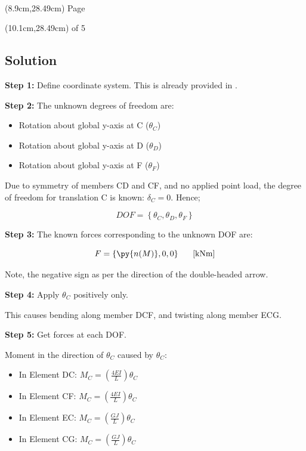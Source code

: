 \documentclass[a4paper,11pt]{article}
\begin{document}
\\
\begin{textblock*}{5cm}(8.9cm,28.49cm)
Page
\end{textblock*}
\begin{textblock*}{5cm}(10.1cm,28.49cm)
of 5
\end{textblock*}
\begin{hidden}	
\clearpage
\section{Solution}

\textbf{Step 1:} Define coordinate system. This is already provided in . 

\textbf{Step 2:} The unknown degrees of freedom are: 

\begin{itemize}
	\item Rotation about global y-axis at C ($\theta_C$)
	\item Rotation about global y-axis at D ($\theta_D$)
	\item Rotation about global y-axis at F ($\theta_F$)
\end{itemize} 

Due to symmetry of members CD and CF, and no applied point load, the degree of freedom for translation C is known: $\delta_C = 0$. Hence; 

\begin{equation}
	DOF = \left\{\theta_C,\theta_D,\theta_F\right\}
\end{equation}

\textbf{Step 3:} The known forces corresponding to the unknown DOF are: 

\begin{equation}
	F = \left\{ \py{n(M)},0,0 \right\} \textrm{\hspace{0.5cm} [kNm]}
\end{equation}

Note, the negative sign as per the direction of the double-headed arrow. 
	
\textbf{Step 4:} Apply $\theta_C$ positively only. 

This causes bending along member DCF, and twisting along member ECG. 

\textbf{Step 5:} Get forces at each DOF. 

Moment in the direction of $\theta_C$ caused by $\theta_C$: 

\begin{itemize}
	\item In Element DC: $M_C = \left(\frac{4EI}{L}\right)\theta_C$
	\item In Element CF: $M_C = \left(\frac{4EI}{L}\right)\theta_C$
	\item In Element EC: $M_C = \left(\frac{GJ}{L}\right)\theta_C$
	\item In Element CG: $M_C = \left(\frac{GJ}{L}\right)\theta_C$
\end{itemize}	


\end{hidden}
\end{document}
